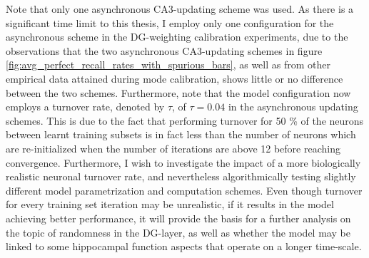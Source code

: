 Note that only one asynchronous CA3-updating scheme was used. As there is a significant time limit to this thesis, I employ only one configuration for the asynchronous scheme in the DG-weighting calibration experiments, due to the observations that the two asynchronous CA3-updating schemes in figure \ref{fig:avg_perfect_recall_rates_with_spurious_bars}, as well as from other empirical data attained during mode calibration, shows little or no difference between the two schemes. Furthermore, note that the model configuration now employs a turnover rate, denoted by $\tau$, of $\tau=0.04$ in the asynchronous updating schemes. This is due to the fact that performing turnover for 50 \% of the neurons between learnt training subsets is in fact less than the number of neurons which are re-initialized when the number of iterations are above 12 before reaching convergence. Furthermore, I wish to investigate the impact of a more biologically realistic neuronal turnover rate, and nevertheless algorithmically testing slightly different model parametrization and computation schemes. Even though turnover for every training set iteration may be unrealistic, if it results in the model achieving better performance, it will provide the basis for a further analysis on the topic of randomness in the DG-layer, as well as whether the model may be linked to some hippocampal function aspects that operate on a longer time-scale.




